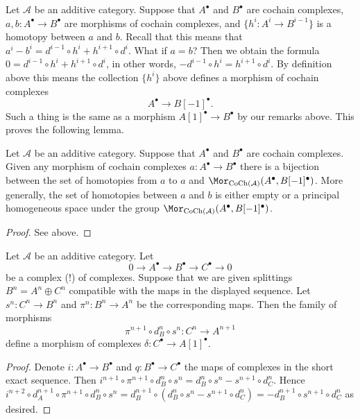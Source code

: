 \medskip\noindent
Let $\mathcal{A}$ be an additive category.
Suppose that $A^\bullet$ and $B^\bullet$ are
cochain complexes, $a, b : A^\bullet \to B^\bullet$ are
morphisms of cochain complexes, and $\{h^i : A^i \to B^{i - 1}\}$
is a homotopy between $a$ and $b$. Recall that this means
that
$a^i - b^i = d^{i - 1} \circ h^i + h^{i + 1} \circ d^i$.
What if $a = b$? Then we obtain the formula
$0 = d^{i - 1} \circ h^i + h^{i + 1} \circ d^i$,
in other words, $ - d^{i - 1} \circ h^i = h^{i + 1} \circ d^i$.
By definition above this means the collection $\{h^i\}$
above defines a morphism of cochain complexes
$$
A^\bullet \longrightarrow B[-1]^\bullet.
$$
Such a thing is the same as a morphism $A[1]^\bullet \to B^\bullet$
by our remarks above. This proves the following lemma.

\begin{lemma}
\label{lemma-homotopy-shift-cochain}
Let $\mathcal{A}$ be an additive category.
Suppose that $A^\bullet$ and $B^\bullet$ are
cochain complexes. Given any morphism of cochain
complexes $a : A^\bullet \to B^\bullet$ there
is a bijection between the set of homotopies
from $a$ to $a$ and
$\Mor_{\text{CoCh}(\mathcal{A})}(A^\bullet, B[-1]^\bullet)$.
More generally, the set of homotopies between
$a$ and $b$ is either empty or a principal homogeneous
space under the group
$\Mor_{\text{CoCh}(\mathcal{A})}(A^\bullet, B[-1]^\bullet)$.
\end{lemma}

\begin{proof}
See above.
\end{proof}

\begin{lemma}
\label{lemma-ses-termwise-split-cochain}
Let $\mathcal{A}$ be an additive category.
Let
$$
0 \to A^\bullet \to B^\bullet \to C^\bullet \to 0
$$
be a complex (!) of complexes.
Suppose that we are given splittings $B^n = A^n \oplus C^n$
compatible with the maps in the displayed sequence.
Let $s^n : C^n \to B^n$ and $\pi^n : B^n \to A^n$ be the
corresponding maps. Then the family of morphisms
$$
\pi^{n + 1} \circ d_B^n \circ s^n
:
C^n \to A^{n + 1}
$$
define a morphism of complexes $\delta : C^\bullet \to A[1]^\bullet$.
\end{lemma}

\begin{proof}
Denote $i : A^\bullet \to B^\bullet$ and $q : B^\bullet \to C^\bullet$
the maps of complexes in the short exact sequence. Then
$i^{n + 1} \circ \pi^{n + 1} \circ d_B^n \circ s^n =
d_B^n \circ s^n - s^{n + 1} \circ d_C^n$. Hence
$i^{n + 2} \circ d_A^{n + 1} \circ \pi^{n + 1} \circ d_B^n \circ s^n =
d_B^{n + 1} \circ (d_B^n \circ s^n - s^{n + 1} \circ d_C^n) =
- d_B^{n + 1} \circ s^{n + 1} \circ d_C^n$ as desired.
\end{proof}

